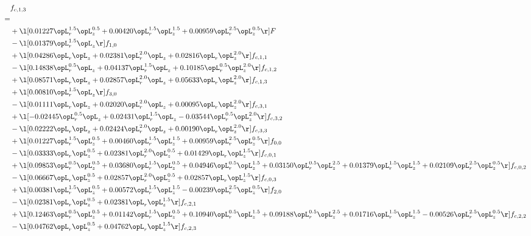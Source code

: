 \begin{alignat}{2} 
\label{eq:f_13_1} 
& f_{c,1,3} \nonumber \\ 
 = \\ 
& + \l[  0.01227 \opL_r^{1.5} \opL_z^{0.5} +  0.00420 \opL_r^{1.5} \opL_z^{1.5} +  0.00959 \opL_r^{2.5} \opL_z^{0.5}  \r] F \nonumber \\ 
& - \l[  0.01379 \opL_r^{1.5} \opL_z  \r] f_{1,0} \nonumber \\ 
& + \l[  0.04286 \opL_r \opL_z +  0.02381 \opL_r^{2.0} \opL_z +  0.02816 \opL_r \opL_z^{2.0}  \r] f_{c,1,1} \nonumber \\ 
& - \l[  0.14838 \opL_r^{0.5} \opL_z +  0.04137 \opL_r^{1.5} \opL_z +  0.10185 \opL_r^{0.5} \opL_z^{2.0}  \r] f_{c,1,2} \nonumber \\ 
& + \l[  0.08571 \opL_r \opL_z +  0.02857 \opL_r^{2.0} \opL_z +  0.05633 \opL_r \opL_z^{2.0}  \r] f_{c,1,3} \nonumber \\ 
& + \l[  0.00810 \opL_r^{1.5} \opL_z  \r] f_{3,0} \nonumber \\ 
& - \l[  0.01111 \opL_r \opL_z +  0.02020 \opL_r^{2.0} \opL_z +  0.00095 \opL_r \opL_z^{2.0}  \r] f_{c,3,1} \nonumber \\ 
& + \l[  -0.02445 \opL_r^{0.5} \opL_z +  0.02431 \opL_r^{1.5} \opL_z   -0.03544 \opL_r^{0.5} \opL_z^{2.0}  \r] f_{c,3,2} \nonumber \\ 
& - \l[  0.02222 \opL_r \opL_z +  0.02424 \opL_r^{2.0} \opL_z +  0.00190 \opL_r \opL_z^{2.0}  \r] f_{c,3,3} \nonumber \\ 
& + \l[  0.01227 \opL_r^{1.5} \opL_z^{0.5} +  0.00460 \opL_r^{1.5} \opL_z^{1.5} +  0.00959 \opL_r^{2.5} \opL_z^{0.5}  \r] f_{0,0} \nonumber \\ 
& - \l[  0.03333 \opL_r \opL_z^{0.5} +  0.02381 \opL_r^{2.0} \opL_z^{0.5} +  0.01429 \opL_r \opL_z^{1.5}  \r] f_{c,0,1} \nonumber \\ 
& + \l[  0.09853 \opL_r^{0.5} \opL_z^{0.5} +  0.03680 \opL_r^{1.5} \opL_z^{0.5} +  0.04946 \opL_r^{0.5} \opL_z^{1.5} +  0.03150 \opL_r^{0.5} \opL_z^{2.5} +  0.01379 \opL_r^{1.5} \opL_z^{1.5} +  0.02109 \opL_r^{2.5} \opL_z^{0.5}  \r] f_{c,0,2} \nonumber \\ 
& - \l[  0.06667 \opL_r \opL_z^{0.5} +  0.02857 \opL_r^{2.0} \opL_z^{0.5} +  0.02857 \opL_r \opL_z^{1.5}  \r] f_{c,0,3} \nonumber \\ 
& + \l[  0.00381 \opL_r^{1.5} \opL_z^{0.5} +  0.00572 \opL_r^{1.5} \opL_z^{1.5}   -0.00239 \opL_r^{2.5} \opL_z^{0.5}  \r] f_{2,0} \nonumber \\ 
& - \l[  0.02381 \opL_r \opL_z^{0.5} +  0.02381 \opL_r \opL_z^{1.5}  \r] f_{c,2,1} \nonumber \\ 
& + \l[  0.12463 \opL_r^{0.5} \opL_z^{0.5} +  0.01142 \opL_r^{1.5} \opL_z^{0.5} +  0.10940 \opL_r^{0.5} \opL_z^{1.5} +  0.09188 \opL_r^{0.5} \opL_z^{2.5} +  0.01716 \opL_r^{1.5} \opL_z^{1.5}   -0.00526 \opL_r^{2.5} \opL_z^{0.5}  \r] f_{c,2,2} \nonumber \\ 
& - \l[  0.04762 \opL_r \opL_z^{0.5} +  0.04762 \opL_r \opL_z^{1.5}  \r] f_{c,2,3} \nonumber \\ 
\end{alignat} 


